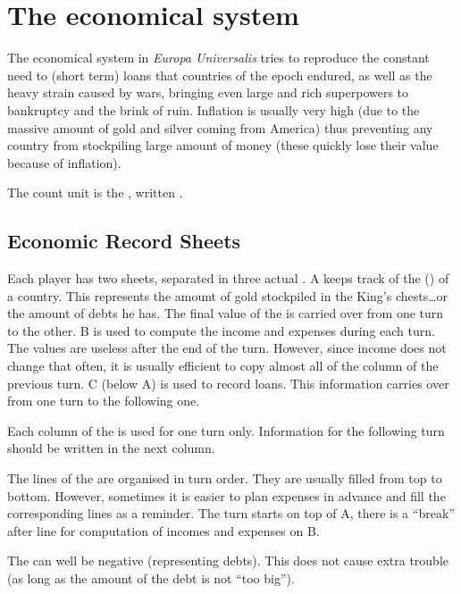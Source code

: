 \section{The economical system}

\aparag The economical system in \emph{Europa Universalis} tries to reproduce
the constant need to (short term) loans that countries of the epoch endured,
as well as the heavy strain caused by wars, bringing even large and rich
superpowers to bankruptcy and the brink of ruin. Inflation is usually very
high (due to the massive amount of gold and silver coming from America) thus
preventing any country from stockpiling large amount of money (these quickly
lose their value because of inflation).

\aparag The count unit is the , written \Ducats.



\subsection{Economic Record Sheets}

\aparag Each player has two sheets, separated in three actual \EcoRS.
\bparag \EcoRS A keeps track of the  (\RT) of a
country. This represents the amount of gold stockpiled in the King's
chests\ldots or the amount of debts he has. The final value of the \RT is
carried over from one turn to the other.
\bparag \EcoRS B is used to compute the income and expenses during each
turn. The values are useless after the end of the turn. However, since income
does not change that often, it is usually efficient to copy almost all of the
column of the previous turn.
\bparag \EcoRS C (below \EcoRS A) is used to record loans. This information
carries over from one turn to the following one.

\aparag Each column of the \EcoRS is used for one turn only. Information for
the following turn should be written in the next column.

\aparag The lines of the \EcoRS are organised in turn order. They are usually
filled from top to bottom. However, sometimes it is easier to plan expenses in
advance and fill the corresponding lines as a reminder.
\bparag The turn starts on top of \EcoRS A, there is a ``break'' after line
 for computation of incomes and expenses on
\EcoRS B.

\aparag The \RT can well be negative (representing debts). This does not cause
extra trouble (as long as the amount of the debt is not ``too big'').



